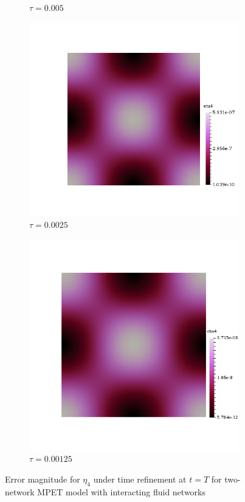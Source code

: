 \begin{figure}[h!]
\begin{subfigure}[b]{0.24\textwidth}
    \caption{$\tau=0.005$}
  \end{subfigure}
  \begin{subfigure}[b]{0.24\textwidth}
    \includegraphics[width=\textwidth,height=\textheight,keepaspectratio,height=\textheight,keepaspectratio]{figures/2_mpet/default/time/eta4_dt3.png}
    \caption{$\tau=0.0025$}
  \end{subfigure}
  \begin{subfigure}[b]{0.24\textwidth}
    \includegraphics[width=\textwidth,height=\textheight,keepaspectratio,height=\textheight,keepaspectratio]{figures/2_mpet/default/time/eta4_dt4.png}
    \caption{$\tau=0.00125$}
  \end{subfigure}
  \caption{Error magnitude for $\eta_4$ under time refinement at $t=T$ for two-network MPET model with interacting fluid networks} \label{fig:bb_default_eta4}
\end{figure}
\clearpage
